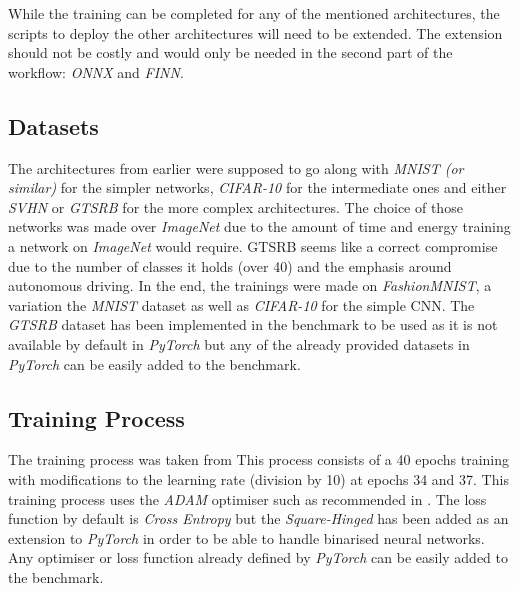 While the training can be completed for any of the mentioned architectures, the scripts to deploy the other architectures will need to be extended. The extension should not be costly and would only be needed in the second part of the workflow: \emph{ONNX} and \emph{FINN}.


\subsection{Datasets}

The architectures from earlier were supposed to go along with \emph{MNIST (or similar)} for the simpler networks, \emph{CIFAR-10} for the intermediate ones and either \emph{SVHN} or \emph{GTSRB} for the more complex architectures. The choice of those networks was made over \emph{ImageNet} due to the amount of time and energy training a network on \emph{ImageNet} would require. GTSRB seems like a correct compromise due to the number of classes it holds (over 40) and the emphasis around autonomous driving. In the end, the trainings were made on \emph{FashionMNIST}, a variation the \emph{MNIST} dataset as well as \emph{CIFAR-10} for the simple CNN. The \emph{GTSRB} dataset has been implemented in the benchmark to be used as it is not available by default in \emph{PyTorch} but any of the already provided datasets in \emph{PyTorch} can be easily added to the benchmark.



\subsection{Training Process}

The training process was taken from \cite{Bethge2018} This process consists of a 40 epochs training with modifications to the learning rate (division by 10) at epochs 34 and 37. This training process uses the \emph{ADAM} optimiser such as recommended in \cite{Alizadeh2018}. The loss function by default is \emph{Cross Entropy} but the \emph{Square-Hinged} has been added as an extension to \emph{PyTorch} in order to be able to handle binarised neural networks. Any optimiser or loss function already defined by \emph{PyTorch} can be easily added to the benchmark.

